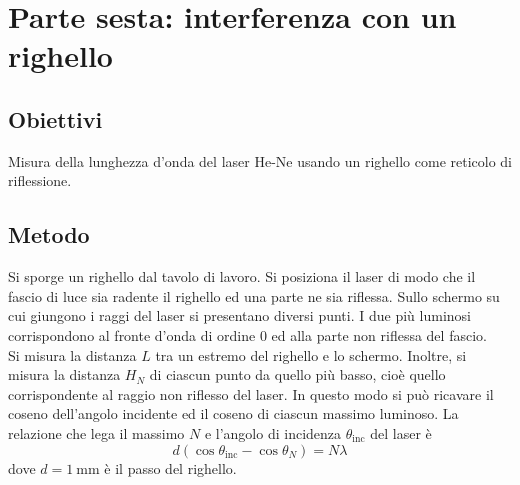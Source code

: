 \documentclass[a4paper]{article}
\begin{document}
\clearpage
\section{Parte sesta: interferenza con un righello}
\subsection{Obiettivi}
Misura della lunghezza d'onda del laser He-Ne usando un righello come reticolo di riflessione.

\subsection{Metodo}
Si sporge un righello dal tavolo di lavoro. Si posiziona il laser di modo che il fascio di luce sia radente il righello ed una parte ne sia riflessa. Sullo schermo su cui giungono i raggi del laser si presentano diversi punti. I due più luminosi corrispondono al fronte d'onda di ordine $0$ ed alla parte non riflessa del fascio.\\
Si misura la distanza $L$ tra un estremo del righello e lo schermo. Inoltre, si misura la distanza $H_N$ di ciascun punto da quello più basso, cioè quello corrispondente al raggio non riflesso del laser. In questo modo si può ricavare il coseno dell'angolo incidente ed il coseno di ciascun massimo luminoso.
La relazione che lega il massimo $N$ e l'angolo di incidenza $\theta_\text{inc}$ del laser è
\[
	d\left( \cos\theta_\text{inc} - \cos\theta_N \right) = N\lambda
\]
dove $d=\SI{1}{\mm}$ è il passo del righello.
\end{document}
